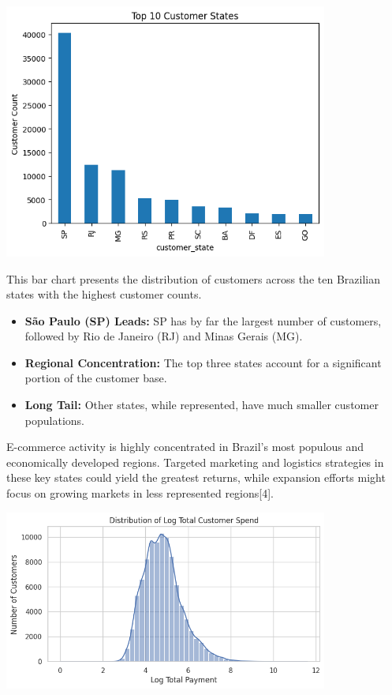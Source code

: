 \documentclass[a4paper]{article}
\begin{document}
\begin{multicols}{2}
\noindent
\begin{minipage}{\columnwidth}
\centering
\includegraphics[width=0.8\textwidth]{plots/Top 10 Customer States.png}
\label{fig:top_10_customer_states}
\end{minipage}

This bar chart presents the distribution of customers across the ten Brazilian states with the highest customer counts.

\begin{itemize}
    \item \textbf{São Paulo (SP) Leads:} SP has by far the largest number of customers, followed by Rio de Janeiro (RJ) and Minas Gerais (MG).
    \item \textbf{Regional Concentration:} The top three states account for a significant portion of the customer base.
    \item \textbf{Long Tail:} Other states, while represented, have much smaller customer populations.
\end{itemize}

E-commerce activity is highly concentrated in Brazil’s most populous and economically developed regions. Targeted marketing and logistics strategies in these key states could yield the greatest returns, while expansion efforts might focus on growing markets in less represented regions[4].




\noindent
\begin{minipage}{\columnwidth}
\centering
\includegraphics[width=0.8\textwidth]{plots/Distribution of Log Total Customer Spend.png}
\label{fig:log_total_spend}
\end{minipage}


\end{multicols}
\end{document}
